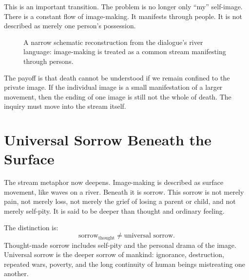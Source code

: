 This is an important transition. The problem is no longer only ``my'' self-image. There is a constant flow of image-making. It manifests through people. It is not described as merely one person's possession.

\begin{figure}
\centering
{}
\caption{A narrow schematic reconstruction from the dialogue's river language: image-making is treated as a common stream manifesting through persons.}
\end{figure}

The payoff is that death cannot be understood if we remain confined to the private image. If the individual image is a small manifestation of a larger movement, then the ending of one image is still not the whole of death. The inquiry must move into the stream itself.

\section{Universal Sorrow Beneath the Surface}

The stream metaphor now deepens. Image-making is described as surface movement, like waves on a river. Beneath it is sorrow. This sorrow is not merely pain, not merely loss, not merely the grief of losing a parent or child, and not merely self-pity. It is said to be deeper than thought and ordinary feeling.

The distinction is:
\begin{equation}
\text{sorrow}_{\mathrm{thought}}
\neq
\text{universal sorrow}.
\end{equation}
Thought-made sorrow includes self-pity and the personal drama of the image. Universal sorrow is the deeper sorrow of mankind: ignorance, destruction, repeated wars, poverty, and the long continuity of human beings mistreating one another.

